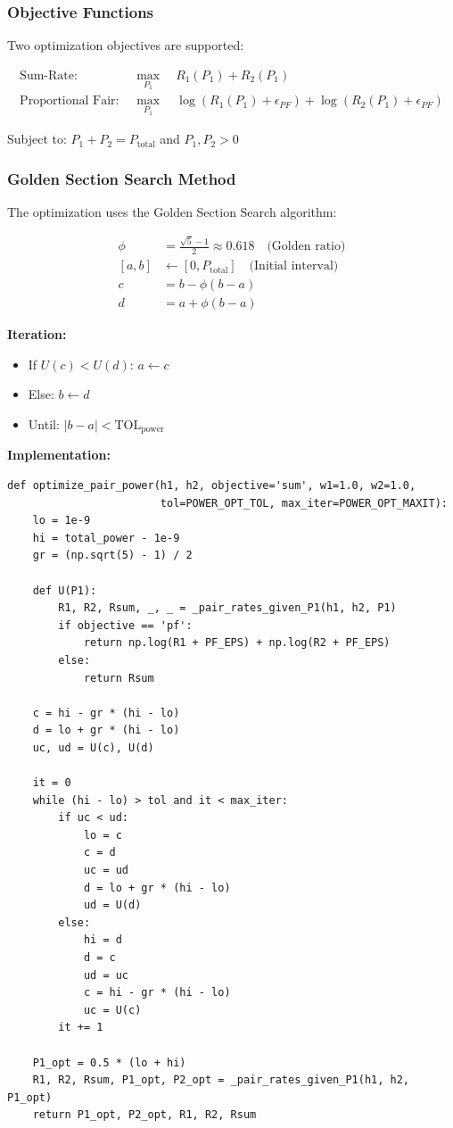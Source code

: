 \documentclass[12pt,a4paper]{article}
\begin{document}
\subsubsection{Objective Functions}

Two optimization objectives are supported:

\begin{align}
\text{Sum-Rate: } &\max_{P_1} \quad R_1(P_1) + R_2(P_1) \\
\text{Proportional Fair: } &\max_{P_1} \quad \log(R_1(P_1) + \epsilon_{PF}) + \log(R_2(P_1) + \epsilon_{PF})
\end{align}

Subject to: $P_1 + P_2 = P_{\text{total}}$ and $P_1, P_2 > 0$

\subsubsection{Golden Section Search Method}

The optimization uses the Golden Section Search algorithm:

\begin{align}
\phi &= \frac{\sqrt{5} - 1}{2} \approx 0.618 \quad \text{(Golden ratio)} \\
[a, b] &\leftarrow [0, P_{\text{total}}] \quad \text{(Initial interval)} \\
c &= b - \phi(b - a) \\
d &= a + \phi(b - a)
\end{align}

\textbf{Iteration:}
\begin{itemize}
    \item If $U(c) < U(d)$: $a \leftarrow c$
    \item Else: $b \leftarrow d$
    \item Until: $|b - a| < \text{TOL}_{\text{power}}$
\end{itemize}

\textbf{Implementation:}
\begin{lstlisting}[caption={Power Optimization via Golden Section Search}]
def optimize_pair_power(h1, h2, objective='sum', w1=1.0, w2=1.0,
                        tol=POWER_OPT_TOL, max_iter=POWER_OPT_MAXIT):
    lo = 1e-9
    hi = total_power - 1e-9
    gr = (np.sqrt(5) - 1) / 2

    def U(P1):
        R1, R2, Rsum, _, _ = _pair_rates_given_P1(h1, h2, P1)
        if objective == 'pf':
            return np.log(R1 + PF_EPS) + np.log(R2 + PF_EPS)
        else:
            return Rsum

    c = hi - gr * (hi - lo)
    d = lo + gr * (hi - lo)
    uc, ud = U(c), U(d)

    it = 0
    while (hi - lo) > tol and it < max_iter:
        if uc < ud:
            lo = c
            c = d
            uc = ud
            d = lo + gr * (hi - lo)
            ud = U(d)
        else:
            hi = d
            d = c
            ud = uc
            c = hi - gr * (hi - lo)
            uc = U(c)
        it += 1

    P1_opt = 0.5 * (lo + hi)
    R1, R2, Rsum, P1_opt, P2_opt = _pair_rates_given_P1(h1, h2, P1_opt)
    return P1_opt, P2_opt, R1, R2, Rsum
\end{lstlisting}
\end{document}
